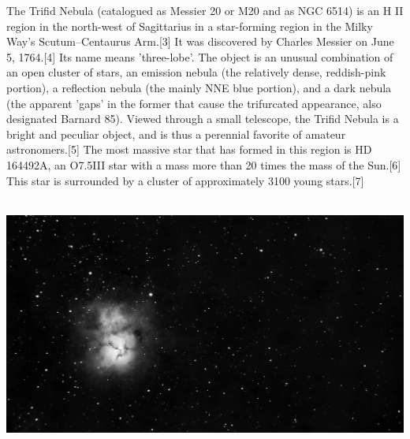 {\footnotesize\color{white}
The Trifid Nebula (catalogued as Messier 20 or M20 and as NGC 6514) is an H II region in the north-west of Sagittarius in a star-forming region in the Milky Way's Scutum–Centaurus Arm.[3] It was discovered by Charles Messier on June 5, 1764.[4] Its name means 'three-lobe'. The object is an unusual combination of an open cluster of stars, an emission nebula (the relatively dense, reddish-pink portion), a reflection nebula (the mainly NNE blue portion), and a dark nebula (the apparent 'gaps' in the former that cause the trifurcated appearance, also designated Barnard 85). Viewed through a small telescope, the Trifid Nebula is a bright and peculiar object, and is thus a perennial favorite of amateur astronomers.[5] The most massive star that has formed in this region is HD 164492A, an O7.5III star with a mass more than 20 times the mass of the Sun.[6] This star is surrounded by a cluster of approximately 3100 young stars.[7]




}\ \\
\includegraphics[width=\textwidth]{../Imaging//Grayscale/Trifid_Nebula.jpg}
